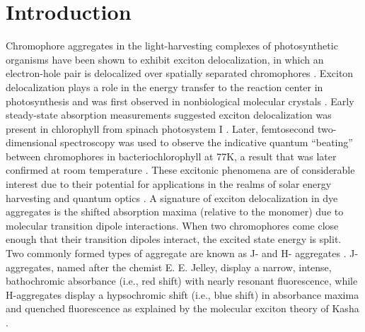 \section{Introduction}
Chromophore aggregates in the light-harvesting complexes of photosynthetic organisms have been shown to exhibit exciton delocalization, in which an electron-hole pair is delocalized over spatially separated chromophores \cite{Engel2007, Collini2010a, Fassioli2014}. Exciton delocalization plays a role in the energy transfer to the reaction center in photosynthesis and was first observed in nonbiological molecular crystals \cite{Frenkel1931a, Davydov1964, Eisfeld2007, Eisfeld2006a}. Early steady-state absorption measurements suggested exciton delocalization was present in chlorophyll from spinach photosystem I \cite{Philipson1972}. Later, femtosecond two-dimensional spectroscopy was used to observe the indicative quantum “beating” between chromophores in bacteriochlorophyll at 77K, a result that was later confirmed at room temperature \cite{Marcus1965a, Lloyd2011a}.  These excitonic phenomena are of considerable interest due to their potential for applications in the realms of solar energy harvesting and quantum optics \cite{Smyth2012a, Rossi2004, Childs2013a}. A signature of exciton delocalization in dye aggregates is the shifted absorption maxima (relative to the monomer) due to molecular transition dipole interactions. When two chromophores come close enough that their transition dipoles interact, the excited state energy is split. Two commonly formed types of aggregate are known as J- and H- aggregates \cite{Wurthner2011}. J-aggregates, named after the chemist E. E. Jelley, display a narrow, intense, bathochromic absorbance (i.e., red shift) with nearly resonant fluorescence, while H-aggregates display a hypsochromic shift (i.e., blue shift) in absorbance maxima and quenched fluorescence as explained by the molecular exciton theory of Kasha \cite{Kasha1963}. 
